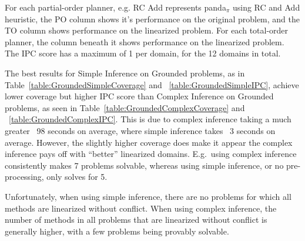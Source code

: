 \documentclass[letterpaper]{article} %
\begin{document}
For each partial-order planner, e.g. RC Add represents panda$_\pi$ using RC and Add heuristic,
the PO column shows it's performance on the original problem, and the TO column shows performance on the linearized problem. For each total-order planner, the column beneath it shows performance on the linearized problem.
The IPC score has a maximum of 1 per domain, for the 12 domains in total.


The best results for Simple Inference on Grounded problems, as in Table~\ref{table:GroundedSimpleCoverage} and ~\ref{table:GroundedSimpleIPC},
achieve lower coverage but higher IPC score than Complex Inference on Grounded problems, as seen in Table~\ref{table:GroundedComplexCoverage} and ~\ref{table:GroundedComplexIPC}. This is due to complex inference taking a much greater ~98 seconds on average, where simple inference takes ~3 seconds on average. However, the slightly higher coverage does make it appear the complex inference pays off with \enquote{better} linearized domains. E.g.\ using complex inference consistently makes 7 problems solvable, whereas using simple inference, or no pre-processing, only solves for 5.
 
Unfortunately, when using simple inference, there are no problems for which all methods are linearized without conflict.
When using complex inference, the number of methods in all problems that are linearized without conflict is generally higher, with a few problems being provably solvable. 
\end{document}
